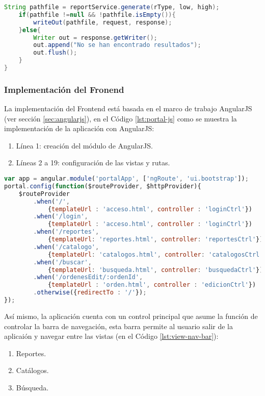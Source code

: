 \begin{enumerate}
\begin{lstlisting}[language=Java, caption={Servicio Web para generar un reporte.}, captionpos=b, label={lst:report-controller-gen}]
	String pathfile = reportService.generate(rType, low, high);
	if(pathfile !=null && !pathfile.isEmpty()){
		writeOut(pathfile, request, response);
	}else{
		Writer out = response.getWriter();
		out.append("No se han encontrado resultados");
		out.flush();
	}
}
\end{lstlisting}

\end{enumerate}


\subsubsection{Implementación del Fronend}\label{sec:frontend}
La implementación del Frontend está basada en el marco de trabajo AngularJS (ver sección \ref{sec:angularjs}), en el Código \ref{lst:portal-js} como se muestra la implementación de la aplicación con AngularJS:
\begin{enumerate}
	\item Línea 1: creación del módulo de AngularJS.
	\item Líneas 2 a 19: configuración de las vistas y rutas.
\end{enumerate}
\begin{lstlisting}[language=Javascript, caption={Módulo de AngularJS para el portalWeb}, captionpos=b, label={lst:portal-js}]
var app = angular.module('portalApp', ['ngRoute', 'ui.bootstrap']);
portal.config(function($routeProvider, $httpProvider){
	$routeProvider
		.when('/',
			{templateUrl : 'acceso.html', controller : 'loginCtrl'})
		.when('/login',
			{templateUrl : 'acceso.html', controller : 'loginCtrl'})
		.when('/reportes',
			{templateUrl: 'reportes.html', controller: 'reportesCtrl'})
		.when('/catalogo',
			{templateUrl: 'catalogos.html', controller: 'catalogosCtrl'})
		.when('/buscar',
			{templateUrl: 'busqueda.html', controller: 'busquedaCtrl'})
		.when('/ordenesEdit/:ordenId',
			{templateUrl : 'orden.html', controller : 'edicionCtrl'})
		.otherwise({redirectTo : '/'});
});
\end{lstlisting}

Así mismo, la aplicación cuenta con un control principal que asume la función de controlar la barra de navegación, esta barra permite al usuario salir de la aplicaión y navegar entre las vistas (en el Código \ref{lst:view-nav-bar}):
\begin{enumerate}
	\item Reportes.
	\item Catálogos.
	\item Búsqueda.
\end{enumerate}


